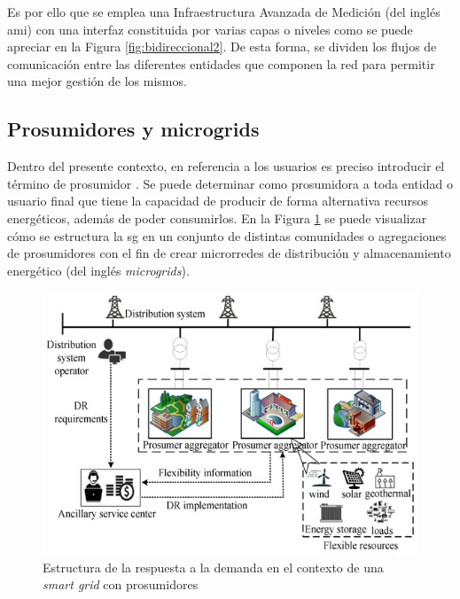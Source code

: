 \vspace{3mm}

Es por ello que se emplea una Infraestructura Avanzada de Medición (del inglés \gls{ami}) con una interfaz constituida por varias capas o niveles como se puede apreciar en la Figura \ref{fig:bidireccional2}. De esta forma, se dividen los flujos de comunicación entre las diferentes entidades que componen la red para permitir una mejor gestión de los mismos. \cite{us}

\vspace{1mm}

\subsection{Prosumidores y microgrids}
\label{sec:prosu}

Dentro del presente contexto, en referencia a los usuarios es preciso introducir el término de prosumidor \cite{prosumer}. Se puede determinar como prosumidora a toda entidad o usuario final que tiene la capacidad de producir de forma alternativa recursos energéticos, además de poder consumirlos. En la Figura \ref{fig:prosumer} se puede visualizar cómo se estructura la \gls{sg} en un conjunto de distintas comunidades o agregaciones de prosumidores con el fin de crear microrredes de distribución y almacenamiento energético (del inglés \textit{microgrids}).

\begin{figure}[h!]
  \centering
  \includegraphics[width=1\textwidth]{img/teoria/prosumer.jpg}
  \caption{Estructura de la respuesta a la demanda en el contexto de una \textit{smart grid} con prosumidores \cite{prosumer}}
  \label{fig:prosumer}
\end{figure}

